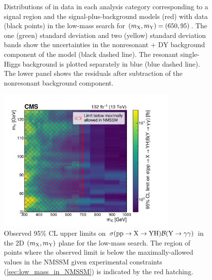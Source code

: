 \begin{figure}
    \caption[Signal-Plus-Background Fits to Data for Low-Mass \XYggHtt Search at $(\mX,\mY)=(650,95)$\GeV]{Distributions of \mgg in data in each analysis category corresponding to a signal region and the signal-plus-background models (red) with data (black points) in the low-mass \XYggHtt search for $(\mX,\mY)=(650,95)$\GeV. The one (green) standard deviation and two (yellow) standard deviation bands show the uncertainties in the nonresonant + DY background component of the model (black dashed line). The resonant single-Higgs background is plotted separately in blue (blue dashed line). The lower panel shows the residuals after subtraction of the nonresonant background component.}\label{fig:sbmodel_6}
\end{figure}

\begin{figure}
    \centering
    \includegraphics[width=0.8\textwidth]{Figures/Dihiggs/results/limits/limits_2d_obs_y_gg_low_mass_paper.pdf}
    \caption[Low-Mass \XYggHtt Upper Limits in the 2D $(\mX,\mY)$ Plane]{Observed 95\% CL upper limits on $\sigma(\mathrm{p}\mathrm{p} \to \mathrm{X} \to \mathrm{Y}\mathrm{H})\mathcal{B}(\mathrm{Y} \to \gamma\gamma)$ in the 2D $(\mX,\mY)$ plane for the low-mass \XYggHtt search. The region of points where the observed limit is below the maximally-allowed values in the NMSSM given experimental constraints (\cref{sec:low_mass_in_NMSSM}) is indicated by the red hatching.}\label{fig:limits_2d_obs_y_gg_low_mass}
\end{figure}

